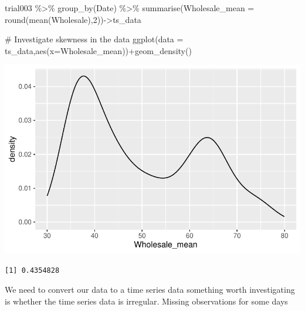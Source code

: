 \documentclass[
  letterpaper,
  DIV=11,
  numbers=noendperiod]{scrartcl}
\newenvironment{Shaded}{\begin{snugshade}}{\end{snugshade}}
\newcommand{\AttributeTok}[1]{\textcolor[rgb]{0.40,0.45,0.13}{#1}}
\newcommand{\CommentTok}[1]{\textcolor[rgb]{0.37,0.37,0.37}{#1}}
\newcommand{\DecValTok}[1]{\textcolor[rgb]{0.68,0.00,0.00}{#1}}
\newcommand{\FunctionTok}[1]{\textcolor[rgb]{0.28,0.35,0.67}{#1}}
\newcommand{\NormalTok}[1]{\textcolor[rgb]{0.00,0.23,0.31}{#1}}
\newcommand{\OtherTok}[1]{\textcolor[rgb]{0.00,0.23,0.31}{#1}}
\newcommand{\SpecialCharTok}[1]{\textcolor[rgb]{0.37,0.37,0.37}{#1}}
\begin{document}
\begin{Shaded}
\begin{Highlighting}[]
\NormalTok{trial003 }\SpecialCharTok{\%\textgreater{}\%} \FunctionTok{group\_by}\NormalTok{(Date) }\SpecialCharTok{\%\textgreater{}\%} \FunctionTok{summarise}\NormalTok{(}\AttributeTok{Wholesale\_mean =} \FunctionTok{round}\NormalTok{(}\FunctionTok{mean}\NormalTok{(Wholesale),}\DecValTok{2}\NormalTok{))}\OtherTok{{-}\textgreater{}}\NormalTok{ts\_data}

\CommentTok{\# Investigate skewness in the data}
\FunctionTok{ggplot}\NormalTok{(}\AttributeTok{data =}\NormalTok{ ts\_data,}\FunctionTok{aes}\NormalTok{(}\AttributeTok{x=}\NormalTok{Wholesale\_mean))}\SpecialCharTok{+}\FunctionTok{geom\_density}\NormalTok{()}
\end{Highlighting}
\end{Shaded}

\includegraphics{Maize_analysis_files/figure-pdf/unnamed-chunk-14-1.pdf}

\begin{Shaded}
\end{Shaded}

\begin{verbatim}
[1] 0.4354828
\end{verbatim}

We need to convert our data to a time series data something worth
investigating is whether the time series data is irregular. Missing
observations for some days

\begin{Shaded}
\end{Shaded}
\end{document}
